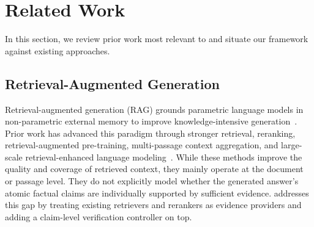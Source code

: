 \section{Related Work}
\label{sec:related_work}


In this section, we review prior work most relevant to \ragname and situate our framework against existing approaches.

\subsection{Retrieval-Augmented Generation}
\label{subsec:related_rag}

Retrieval-augmented generation (RAG) grounds parametric language models in non-parametric external memory to improve knowledge-intensive generation~\cite{guu2020retrieval,lewis2020retrieval}. Prior work has advanced this paradigm through stronger retrieval, reranking, retrieval-augmented pre-training, multi-passage context aggregation, and large-scale retrieval-enhanced language modeling~\cite{karpukhin2020dense,izacard2021leveraging,izacard2023atlas,borgeaud2022improving,robertson2009probabilistic,nogueira2019passage}. While these methods improve the quality and coverage of retrieved context, they mainly operate at the document or passage level. They do not explicitly model whether the generated answer's atomic factual claims are individually supported by sufficient evidence. \ragname addresses this gap by treating existing retrievers and rerankers as evidence providers and adding a claim-level verification controller on top.

